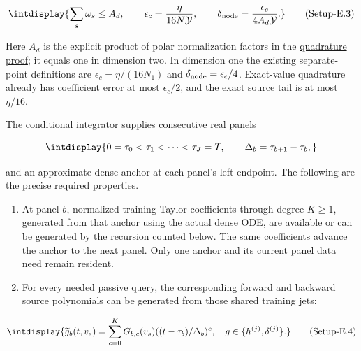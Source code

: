 \label{int:eq-setup-e-3}
\begingroup\renewcommand{\theHequation}{intdisplay.1002}
\begin{equation}
\intdisplay{
\sum_s\omega_s\le A_d,
\qquad
\epsilon_c=\frac{\eta}{16N\mathcal Y},\qquad
\delta_{\rm node}=\frac{\epsilon_c}{4A_d\mathcal Y}.
}
\tag{Setup-E.3}
\label{int:eq-0518-setup-e-3}
\end{equation}
\endgroup


Here \(A_d\) is the explicit product of polar normalization factors in the \hyperref[int:setup-quadrature]{quadrature proof}; it equals one in dimension two. In dimension one the existing separate-point definitions are \(\epsilon_c=\eta/(16N_1)\) and \(\delta_{\rm node}=\epsilon_c/4\). Exact-value quadrature already has coefficient error at most \(\epsilon_c/2\), and the exact source tail is at most \(\eta/16\).



The conditional integrator supplies consecutive real panels


\begingroup\renewcommand{\theHequation}{intdisplay.1003}
\begin{equation*}
\intdisplay{
0=\tau_0<\tau_1<\cdots<\tau_J=T,
\qquad \Delta_b=\tau_{b+1}-\tau_b,
}
\end{equation*}
\endgroup


and an approximate dense anchor at each panel's left endpoint. The following are the precise required properties.


\begin{enumerate}
\item[1.] At panel \(b\), normalized training Taylor coefficients through degree \(K\ge1\), generated from that anchor using the actual dense ODE, are available or can be generated by the recursion counted below. The same coefficients advance the anchor to the next panel. Only one anchor and its current panel data need remain resident.
\item[2.] For every needed passive query, the corresponding forward and backward source polynomials can be generated from those shared training jets:
\end{enumerate}

\label{int:eq-setup-e-4}
\begingroup\renewcommand{\theHequation}{intdisplay.1004}
\begin{equation}
\intdisplay{
\widetilde g_b(t,v_s)=\sum_{c=0}^K G_{b,c}(v_s)
                 ((t-\tau_b)/\Delta_b)^c,
   \quad g\in\{h^{(j)},\delta^{(j)}\}.
}
\tag{Setup-E.4}
\label{int:eq-0519-setup-e-4}
\end{equation}
\endgroup

